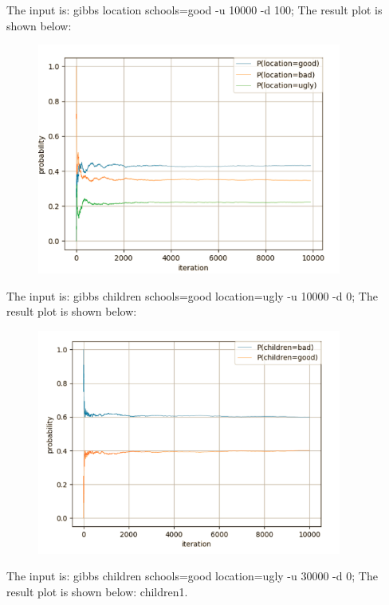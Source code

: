 \documentclass[11pt, a4paper]{article}
\begin{document}
\newpage

The input is: gibbs location schools=good -u 10000 -d 100; The result plot is shown below: 

\begin{figure}[htbp]
	
	\centering 
	\includegraphics[width=10cm]{gs_8}
	
	\label{fig:gb8}
	
\end{figure}

The input is: gibbs children schools=good location=ugly -u 10000 -d 0; The result plot is shown below: 

\begin{figure}[htbp]
	
	\centering 
	\includegraphics[width=10cm]{gs_9}
	
	\label{fig:gb9}
	
\end{figure}


The input is: gibbs children schools=good location=ugly -u 30000 -d 0; The result plot is shown below: children1.
\end{document}
